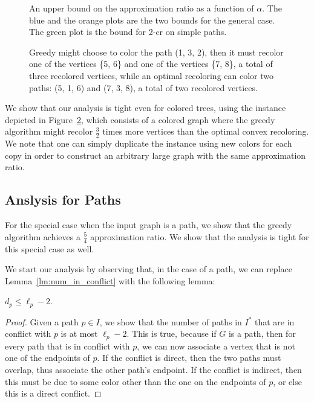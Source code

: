 \begin{figure}
\centering

\caption{
\label{fig:upper_bound}
An upper bound on the approximation ratio as a function of $\alpha$.
The blue and the orange plots are the two bounds for the general case.
The green plot is the bound for 2-cr on simple paths.
}
\end{figure}

\begin{figure}
\centering

\caption{
Greedy might choose to color the path (1, 3, 2), 
then it must recolor one of the vertices \{5, 6\} 
and one of the vertices \{7, 8\}, 
a total of three recolored vertices, 
while an optimal recoloring can color two paths: (5, 1, 6) and (7, 3, 8), 
a total of two recolored vertices.}
\label{fig:tight}
\end{figure}

We show that our analysis is tight even for colored trees, using the
instance depicted in Figure~\ref{fig:tight}, 
which consists of a colored graph where the greedy algorithm might recolor
$\frac{3}{2}$ times more vertices than the optimal convex recoloring.
%
We note that one can simply duplicate the instance using new colors for
each copy in order to construct an arbitrary large graph with the same
approximation ratio.


\subsection{Anslysis for Paths}

For the special case when the input graph is a path, 
we show that the greedy algorithm achieves a $\frac{5}{4}$ approximation ratio.
We show that the analysis is tight for this special case as well.

We start our analysis  by observing that, in the case of a path, we can replace
Lemma~\ref{lm:num_in_conflict} with the following lemma:

\begin{lemma}
$d_p \leq \ell_p - 2$.
\end{lemma}
\begin{proof}
Given a path $p \in I$, we show that the number of paths in $I^*$ that
are in conflict with $p$ is at most $\ell_p - 2$.  This is true,
because if $G$ is a  path, then for every path that is in
conflict with $p$, we can now associate a vertex that is not one of
the endpoints of $p$.  If the conflict is direct, then the two paths
must overlap, thus associate the other path's endpoint.  If the
conflict is indirect, then this must be due to some color other than
the one on the endpoints of $p$, or else this is a direct conflict.
{}\end{proof}

